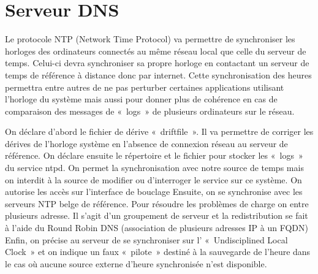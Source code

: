 \section{Serveur DNS}
Le protocole NTP (Network Time Protocol) va permettre de synchroniser les horloges des ordinateurs connectés au même réseau local que celle du serveur de temps.
Celui-ci devra synchroniser sa propre horloge en contactant un serveur de temps de référence à distance donc  par internet.
Cette synchronisation des heures permettra entre autres de ne pas perturber certaines applications utilisant l’horloge du système mais aussi pour donner plus de cohérence en cas de comparaison des messages de « logs » de plusieurs ordinateurs sur le réseau.



On déclare d’abord le fichier de dérive « driftfile ». Il va permettre de corriger les dérives de l’horloge système en l’absence de connexion réseau au serveur de référence.
On déclare ensuite le répertoire et le fichier pour stocker les « logs » du service ntpd. 
On permet la synchronisation avec notre source de temps mais on interdit à la source de modifier ou d’interroger le service sur ce système.
On autorise les accès sur l’interface de bouclage
Ensuite, on se synchronise avec les serveurs NTP belge de référence. Pour résoudre les problèmes de charge on entre plusieurs adresse. Il s’agit d’un groupement de serveur et la redistribution se fait à l’aide du Round Robin DNS (association de plusieurs adresses IP à un FQDN)
Enfin, on précise au serveur de se synchroniser sur l’ « Undisciplined Local Clock » et on indique un faux « pilote » destiné à la sauvegarde de l’heure dans le cas où aucune source externe d’heure synchronisée n’est disponible.
